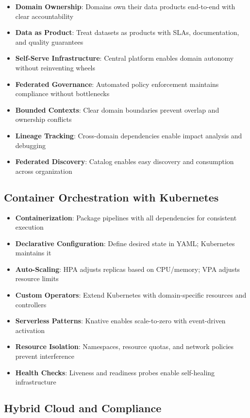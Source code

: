 \begin{itemize}
    \item \textbf{Domain Ownership}: Domains own their data products end-to-end with clear accountability
    \item \textbf{Data as Product}: Treat datasets as products with SLAs, documentation, and quality guarantees
    \item \textbf{Self-Serve Infrastructure}: Central platform enables domain autonomy without reinventing wheels
    \item \textbf{Federated Governance}: Automated policy enforcement maintains compliance without bottlenecks
    \item \textbf{Bounded Contexts}: Clear domain boundaries prevent overlap and ownership conflicts
    \item \textbf{Lineage Tracking}: Cross-domain dependencies enable impact analysis and debugging
    \item \textbf{Federated Discovery}: Catalog enables easy discovery and consumption across organization
\end{itemize}

\subsection{Container Orchestration with Kubernetes}

\begin{itemize}
    \item \textbf{Containerization}: Package pipelines with all dependencies for consistent execution
    \item \textbf{Declarative Configuration}: Define desired state in YAML; Kubernetes maintains it
    \item \textbf{Auto-Scaling}: HPA adjusts replicas based on CPU/memory; VPA adjusts resource limits
    \item \textbf{Custom Operators}: Extend Kubernetes with domain-specific resources and controllers
    \item \textbf{Serverless Patterns}: Knative enables scale-to-zero with event-driven activation
    \item \textbf{Resource Isolation}: Namespaces, resource quotas, and network policies prevent interference
    \item \textbf{Health Checks}: Liveness and readiness probes enable self-healing infrastructure
\end{itemize}

\subsection{Hybrid Cloud and Compliance}

